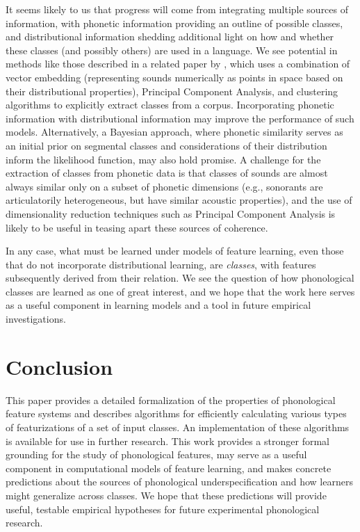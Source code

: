 \documentclass[12pt, oneside]{article}   	%
\begin{document}
It seems likely to us that progress will come from integrating multiple sources of information, with phonetic information providing an outline of possible classes, and distributional information shedding additional light on how and whether these classes (and possibly others) are used in a language. We see potential in methods like those described in a related paper by , which uses a combination of vector embedding (representing sounds numerically as points in space based on their distributional properties), Principal Component Analysis, and clustering algorithms to explicitly extract classes from a corpus. Incorporating phonetic information with distributional information may improve the performance of such models. Alternatively, a Bayesian approach, where phonetic similarity serves as an initial prior on segmental classes and considerations of their distribution inform the likelihood function, may also hold promise. A challenge for the extraction of classes from phonetic data is that classes of sounds are almost always similar only on a subset of phonetic dimensions (e.g., sonorants are articulatorily heterogeneous, but have similar acoustic properties), and the use of dimensionality reduction techniques such as Principal Component Analysis is likely to be useful in teasing apart these sources of coherence.

In any case, what must be learned under models of feature learning, even those that do not incorporate distributional learning, are \textit{classes}, with features subsequently derived from their relation. We see the question of how phonological classes are learned as one of great interest, and we hope that the work here serves as a useful component in learning models and a tool in future empirical investigations.

\FloatBarrier
\section{Conclusion}
\label{sec:conclusion}

This paper provides a detailed formalization of the properties of phonological feature systems and describes algorithms for efficiently calculating various types of featurizations of a set of input classes. An implementation of these algorithms is available for use in further research. This work provides a stronger formal grounding for the study of phonological features, may serve as a useful component in computational models of feature learning, and makes concrete predictions about the sources of phonological underspecification and how learners might generalize across classes. We hope that these predictions will provide useful, testable empirical hypotheses for future experimental phonological research.
\end{document}
